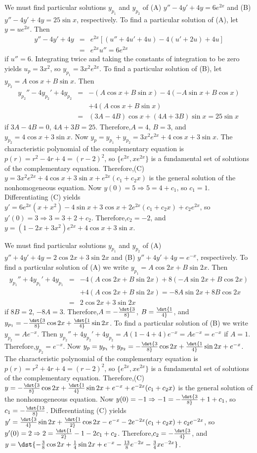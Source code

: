 \documentclass[dvips]{book}
\renewcommand{\exer}[1]{\par\medskip\;\noindent{\color{red}\bf #1.}}
\numberwithin{example}{section}
\numberwithin{equation}{section}
\numberwithin{theorem}{section}
\numberwithin{table}{section}
\numberwithin{figure}{section}
\begin{document}
\exer{5.5.32}
We must find particular solutions $y_{p_1}$ and $y_{p_2}$ of
(A) $y''-4y'+4y=6e^{2x}$ and
(B) $y''-4y'+4y=25\sin x$, respectively.
To find a particular solution of (A), let
 $y=ue^{2x}$. Then
\begin{eqnarray*}
y''-4y'+4y&=&e^{2x}\left[(u''+4u'+4u)-4(u'+2u)+4u\right]\\
&=&e^{2x}u''=6e^{2x}
\end{eqnarray*}
if $u''=6$. Integrating twice and taking the constants of integration
to be zero yields $u_p=3x^2$, so $y_{p_1}=3x^2e^{2x}$.
To find a particular solution of (B), let
 $y_{p_2}=A\cos x+B\sin x$. Then
\begin{eqnarray*}
y_{p_2}''-4y_{p_2}'+4y_{p_2}&=&-(A\cos x+B\sin x)-4(-A\sin x+B\cos x)\\
&&+4(A\cos x+B\sin x)\\ &=& (3A-4B)\cos x+(4A+3B)\sin x=25\sin x
\end{eqnarray*}
if $3A-4B=0$, $4A+3B=25$. Therefore,$A=4$, $B=3$, and $y_{p_2}=4\cos
x+3\sin x$. Now $y_p=y_{p_1}+y_{p_2}=3x^2e^{2x}+4\cos x+3\sin x$. The
characteristic polynomial of the complementary equation is
$p(r)=r^2-4r+4=(r-2)^2$, so $\{e^{2x},xe^{2x}\}$ is a fundamental set
of solutions of the complementary equation. Therefore,(C)
$y=3x^2e^{2x}+4\cos x+3\sin x+e^{2x}(c_1+c_2x)$ is the general
solution of the nonhomogeneous equation. Now $y(0)=5\Rightarrow
5=4+c_1$, so $c_1=1$. Differentiating (C) yields
$y'=6e^{2x}(x+x^2)-4\sin x+3\cos x+2e^{2x}(c_1+c_2x)+c_2e^{2x}$, so
$y'(0)=3\Rightarrow 3=3+2+c_2$. Therefore,$c_2=-2$, and
$y=(1-2x+3x^2)e^{2x}+4\cos x+3\sin x$.



\exer{5.5.34}
We must find particular solutions $y_{p_1}$ and $y_{p_2}$ of
(A) $y''+4y'+4y=2\cos2x+3\sin2x$ and
(B) $y''+4y'+4y=e^{-x}$,  respectively.
To find a particular solution of (A) we write
 $y_{p_1}=A\cos2x+B\sin2x$. Then
\begin{eqnarray*}
y_{p_1}''+4y_{p_1}'+4y_{p_1}&=&
-4(A\cos2x+B\sin2x)+8(-A\sin2x+B\cos2x)\\ &&+4(A\cos2x+B\sin2x)
=-8A\sin2x+8B\cos2x\\ &=& 2\cos2x+3\sin2x
\end{eqnarray*}
if $8B=2$, $-8A=3$. Therefore,$A=-\dst{3\over8}$, $B=\dst{1\over4}$,
and $y_{p_1}=-\dst{3\over8}\cos2x+\dst{1\over4}\sin2x$. To find a
particular solution of (B) we write $y_{p_2}=Ae^{-x}$. Then
$y_{p_2}''+4y_{p_2}'+4y_{p_2}=A(1-4+4)e^{-x}=Ae^{-x}=e^{-x}$ if $A=1$.
Therefore,$y_{p_2}=e^{-x}$. Now $y_p=y_{p_1}+y_{p_2}=
-\dst{3\over8}\cos2x+\dst{1\over4}\sin2x+e^{-x}$. The characteristic
polynomial of the complementary equation is $p(r)=r^2+4r+4=(r-2)^2$,
so $\{e^{2x},xe^{2x}\}$ is a fundamental set of solutions of the
complementary equation. Therefore,(C)
$y=-\dst{3\over8}\cos2x+\dst{1\over4}\sin2x+e^{-x}+e^{-2x}(c_1+c_2x)$
is the general solution of the nonhomogeneous equation. Now
$y(0)=-1\Rightarrow -1=-\dst{3\over8}+1+c_1$, so
$c_1=-\dst{13\over8}$. Differentiating (C) yields
$y'=\dst{3\over4}\sin2x+\dst{1\over2}\cos2x-e^{-x}-2e^{-2x}(c_1+c_2x)
+c_2e^{-2x}$, so $y'(0)=2\Rightarrow 2=\dst{1\over2}-1-2c_1+c_2$.
Therefore,$c_2=-\dst{3\over4}$, and
$y=\dst{-{3\over8}\cos2x+{1\over4}\sin2x+e^{-x}-{13\over8}e^{-2x}-
{3\over4}xe^{-2x}}$.
\end{document}
